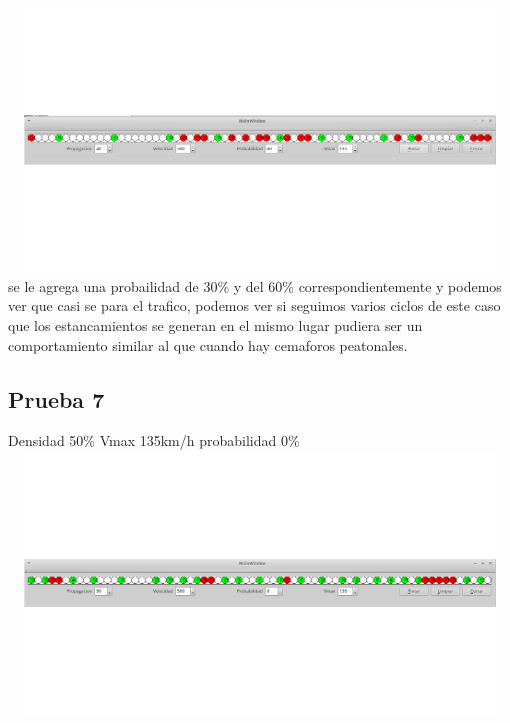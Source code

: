 \documentclass[a4paper,10pt]{article}
\begin{document}
\\
\includegraphics[width=15cm, height=7cm]{25}
\\
se le agrega una probailidad de 30\% y del 60\% correspondientemente y podemos ver que casi se para el trafico, podemos ver si seguimos varios ciclos de este caso que los estancamientos se generan en el mismo lugar pudiera ser un comportamiento similar al que cuando hay cemaforos peatonales.
\subsection{Prueba 7}
Densidad 50\% Vmax 135km/h probabilidad 0\%
\\
\includegraphics[width=15cm, height=7cm]{26}
\\
\end{document}
